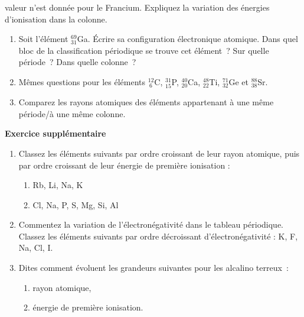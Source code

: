  valeur n'est donn\'ee pour le Francium. Expliquez la variation des \'energies d'ionisation dans la colonne.
\begin{enumerate}[\bf 1)]
\item Soit l'\'el\'ement $_{31}^{69}$Ga. \'Ecrire sa configuration \'electronique atomique.
Dans quel bloc de la classification p\'eriodique se trouve cet \'el\'ement~?
Sur quelle p\'eriode~?
Dans quelle colonne~?
\item M\^emes questions pour les \'el\'ements $_{~6}^{12}$C, $_{15}^{31}$P, $_{20}^{40}$Ca, 
$_{22}^{48}$Ti, $_{32}^{71}$Ge et $_{38}^{88}$Sr.
\item Comparez les rayons atomiques des \'el\'ements appartenant \`a une m\^eme p\'eriode/\`a une m\^eme colonne.
\end{enumerate}
{\bf Exercice supplémentaire}
\begin{enumerate}[\bf 1)]
\item Classez les \'el\'ements suivants par ordre croissant de leur rayon atomique, puis par ordre croissant
de leur énergie de première ionisation :
\begin{enumerate}%
\item Rb, Li, Na, K
\item Cl, Na, P, S, Mg, Si, Al
\end{enumerate}
\item Commentez la variation de l'\'electron\'egativit\'e dans le tableau p\'eriodique. Classez les \'el\'ements suivants par ordre d\'ecroissant d'\'electron\'egativit\'e : K, F, Na, Cl, I.
\item Dites comment \'evoluent les grandeurs suivantes pour les alcalino terreux~:
\begin{enumerate}%
\item rayon atomique,
\item \'energie de premi\`ere ionisation.
\end{enumerate}
\end{enumerate}
%
